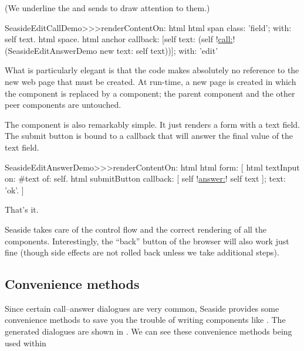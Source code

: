 \documentclass[a4paper,10pt,twoside]{book}
\begin{document}
(We underline the  and  sends to draw attention to them.)

\begin{code}{}
SeasideEditCallDemo>>>renderContentOn: html 
	html span
		class: 'field';
		with: self text.
	html space.
	html anchor
		callback: [self text: (self !\underline{call:}! (SeasideEditAnswerDemo new text: self text))];
		with: 'edit'
\end{code}{}

What is particularly elegant is that the code makes absolutely no reference to the new web page that must be created.
At run-time, a new page is created in which the  component is replaced by a  component; the parent component and the other peer components are untouched.


The  component is also remarkably simple.
It just renders a form with a text field.
The submit button is bound to a callback that will answer the final value of the text field.

\begin{code}{}
SeasideEditAnswerDemo>>>renderContentOn: html
	html form: [
		html textInput
			on: #text of: self.
		html submitButton
			callback: [ self !\underline{answer:}! self text ];
			text: 'ok'.
		]
\end{code}{}

That's it.

Seaside takes care of the control flow and the correct rendering of all the components.
Interestingly, the ``back'' button of the browser will also work just fine (though side effects are not rolled back unless we take additional steps).

\subsection{Convenience methods}

Since certain call--answer dialogues are very common, Seaside provides some convenience methods to save you the trouble of writing components like .
The generated dialogues are shown in .
We can see these convenience methods being used within 
\end{document}
